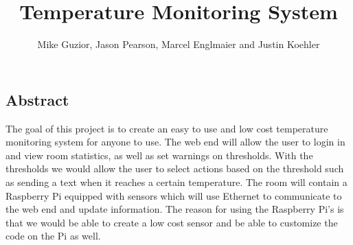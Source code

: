 \documentclass{report}
\begin{document}
\title{Temperature Monitoring System}
\author{Mike Guzior, Jason Pearson, Marcel Englmaier and Justin Koehler}
\maketitle
\tableofcontents
\newpage
\subsection*{Abstract}
The goal of this project is to create an easy to use and low cost temperature monitoring system for anyone to use. 
The web end will allow the user to login in and view room statistics, as well as set warnings on thresholds. 
With the thresholds we would allow the user to select actions based on the threshold such as sending a text when it reaches a certain temperature. 
The room will contain a Raspberry Pi equipped with sensors which will use Ethernet to communicate to the web end and update information. 
The reason for using the Raspberry Pi’s is that we would be able to create a low cost sensor and be able to customize the code on the Pi as well. 
\newpage
\end{document}
